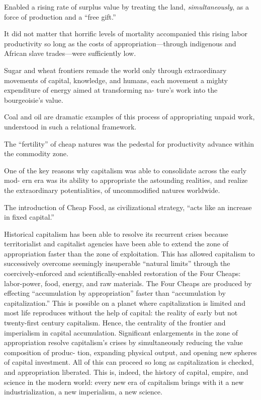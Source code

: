 \documentclass[
]{book}
\begin{document}
Enabled a rising rate of surplus
value by treating the land, \emph{simultaneously}, as a force of production and
a ``free gift.''

It did not matter that horrific levels of mortality accompanied
this rising labor productivity so long as the costs of
appropriation---through indigenous and African slave trades---were
sufficiently low.

Sugar and wheat frontiers remade the world only through
extraordinary movements of capital, knowledge, and humans, each
movement a mighty expenditure of energy aimed at transforming na-
ture's work into the bourgeoisie's value.

Coal and oil are dramatic
examples of this process of appropriating unpaid work, understood
in such a relational framework.

The ``fertility'' of
cheap natures was the pedestal for productivity advance within the
commodity zone.

One of the key
reasons why capitalism was able to consolidate across the early mod-
ern era was its ability to appropriate the astounding realities, and
realize the extraordinary potentialities, of uncommodified natures
worldwide.

The introduction of Cheap
Food, as civilizational strategy, ``acts like an increase in fixed capital.''

Historical capitalism has been able to resolve its recurrent
crises because territorialist and capitalist agencies have been able to
extend the zone of appropriation faster than the zone of exploitation.
This has allowed capitalism to successively overcome seemingly
insuperable ``natural limits'' through the coercively-enforced and
scientifically-enabled restoration of the Four Cheaps: labor-power,
food, energy, and raw materials. The Four Cheaps are produced by
effecting ``accumulation by appropriation'' faster than ``accumulation
by capitalization.'' This is possible on a planet where capitalization is
limited and most life reproduces without the help of capital: the
reality of early but not twenty-first century capitalism. Hence, the
centrality of the frontier and imperialism in capital accumulation.
Significant enlargements in the zone of appropriation resolve capitalism's
crises by simultaneously reducing the value composition of produc-
tion, expanding physical output, and opening new spheres of capital
investment. All of this can proceed so long as capitalization is
checked, and appropriation liberated. This is, indeed, the history of
capital, empire, and science in the modern world: every new era of
capitalism brings with it a new industrialization, a new imperialism, a
new science.
\end{document}

